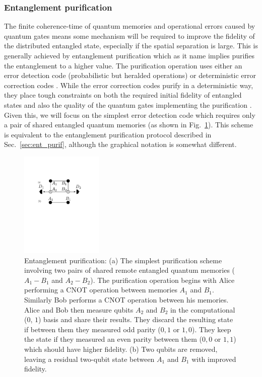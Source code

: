 \documentclass[twocolumn, aps, rmp, amsmath, amssymb, nofootinbib, superscriptaddress, longbibliography, floatfix, table-of-contents, eqsecnum]{revtex4-1}
\begin{document}
\subsubsection{Entanglement purification}\label{sec:reps_ent_purif}

The finite coherence-time of quantum memories and operational errors caused by quantum gates means some mechanism will be required to improve the fidelity of the distributed entangled state, especially if the spatial separation is large. This is generally achieved by entanglement purification \cite{bib:Bennett96, bib:Deutsch98, bib:dur98, bib:pan01, bib:dur07, bib:Aschauer2004, bib:jiang09, bib:munro12, bib:Stephens2013} which  as it name implies purifies the entanglement to a higher value. The purification operation uses either an error detection code (probabilistic but heralded operations) \cite{bib:Bennett96, bib:Deutsch98, bib:dur98} or deterministic error correction codes \cite{bib:Aschauer2004, bib:jiang09, bib:munro12}. While the error correction codes purify in a deterministic way, they place tough constraints on both the required initial fidelity of entangled states and also the quality of the quantum gates implementing the purification \cite{bib:Aschauer2004}. Given this, we will focus on the simplest error detection code which requires only a pair of shared entangled quantum memories (as shown in Fig.~\ref{fig:repeaters_4}). This scheme is equivalent to the entanglement purification protocol described in Sec.~\ref{sec:ent_purif}, although the graphical notation is somewhat different.

\begin{figure}[!htb]
\includegraphics[width=0.35\textwidth]{repeaters_4}
\caption{Entanglement purification: (a) The simplest purification scheme involving two pairs of shared remote entangled quantum memories (\mbox{$A_1-B_1$} and \mbox{$A_2-B_2$}). The purification operation begins with Alice performing a CNOT operation between memories $A_1$ and $B_1$. Similarly Bob performs a CNOT operation between his memories. Alice and Bob then measure qubits $A_2$ and $B_2$ in the computational ($0$, $1$) basis and share their results. They discard the resulting state if between them they measured odd parity ($0,1$ or $1,0$). They keep the state if they measured an even parity between them ($0,0$ or $1,1$) which should have higher fidelity. (b) Two qubits are removed, leaving a residual two-qubit state between $A_1$ and $B_1$ with improved fidelity.} 
\label{fig:repeaters_4}
\end{figure} 
\end{document}
